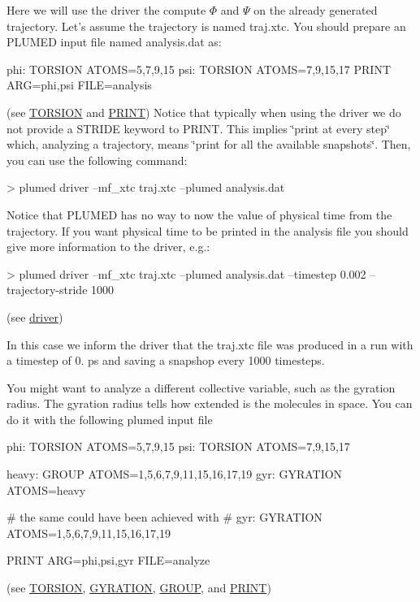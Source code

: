 Here we will use the driver the compute $\Phi$ and $\Psi$ on the already generated trajectory. Let's assume the trajectory is named {\ttfamily traj.\+xtc}. You should prepare an P\+L\+U\+M\+E\+D input file named {\ttfamily analysis.\+dat} as\+: \begin{DoxyVerb}phi: TORSION ATOMS=5,7,9,15
psi: TORSION ATOMS=7,9,15,17
PRINT ARG=phi,psi FILE=analysis
\end{DoxyVerb}
 (see \hyperlink{TORSION}{T\+O\+R\+S\+I\+O\+N} and \hyperlink{PRINT}{P\+R\+I\+N\+T}) Notice that typically when using the driver we do not provide a S\+T\+R\+I\+D\+E keyword to P\+R\+I\+N\+T. This implies \char`\"{}print at every step\char`\"{} which, analyzing a trajectory, means \char`\"{}print for all the available snapshots\char`\"{}. Then, you can use the following command\+: \begin{DoxyVerb}> plumed driver --mf_xtc traj.xtc --plumed analysis.dat
\end{DoxyVerb}
 Notice that P\+L\+U\+M\+E\+D has no way to now the value of physical time from the trajectory. If you want physical time to be printed in the {\ttfamily analysis} file you should give more information to the driver, e.\+g.\+: \begin{DoxyVerb}> plumed driver --mf_xtc traj.xtc --plumed analysis.dat --timestep 0.002 --trajectory-stride 1000
\end{DoxyVerb}
 (see \hyperlink{driver}{driver})

In this case we inform the driver that the {\ttfamily traj.\+xtc} file was produced in a run with a timestep of 0. ps and saving a snapshop every 1000 timesteps.

You might want to analyze a different collective variable, such as the gyration radius. The gyration radius tells how extended is the molecules in space. You can do it with the following plumed input file

\begin{DoxyVerb}phi: TORSION ATOMS=5,7,9,15
psi: TORSION ATOMS=7,9,15,17

heavy: GROUP ATOMS=1,5,6,7,9,11,15,16,17,19
gyr: GYRATION ATOMS=heavy

# the same could have been achieved with
# gyr: GYRATION ATOMS=1,5,6,7,9,11,15,16,17,19

PRINT ARG=phi,psi,gyr FILE=analyze
\end{DoxyVerb}
 (see \hyperlink{TORSION}{T\+O\+R\+S\+I\+O\+N}, \hyperlink{GYRATION}{G\+Y\+R\+A\+T\+I\+O\+N}, \hyperlink{GROUP}{G\+R\+O\+U\+P}, and \hyperlink{PRINT}{P\+R\+I\+N\+T})


